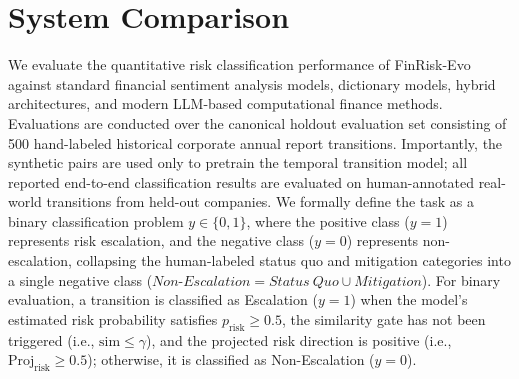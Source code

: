 \documentclass[journal]{IEEEtran}
\begin{document}
\section{System Comparison}
We evaluate the quantitative risk classification performance of FinRisk-Evo against standard financial sentiment analysis models, dictionary models, hybrid architectures, and modern LLM-based computational finance methods. Evaluations are conducted over the canonical holdout evaluation set consisting of 500 hand-labeled historical corporate annual report transitions. Importantly, the synthetic pairs are used only to pretrain the temporal transition model; all reported end-to-end classification results are evaluated on human-annotated real-world transitions from held-out companies. We formally define the task as a binary classification problem $y \in \{0, 1\}$, where the positive class ($y=1$) represents risk escalation, and the negative class ($y=0$) represents non-escalation, collapsing the human-labeled status quo and mitigation categories into a single negative class ($Non\text{-}Escalation = Status\ Quo \cup Mitigation$). For binary evaluation, a transition is classified as Escalation ($y=1$) when the model's estimated risk probability satisfies $p_{\text{risk}} \geq 0.5$, the similarity gate has not been triggered (i.e., $\text{sim} \leq \gamma$), and the projected risk direction is positive (i.e., $\text{Proj}_{\text{risk}} \geq 0.5$); otherwise, it is classified as Non-Escalation ($y=0$).
\end{document}
